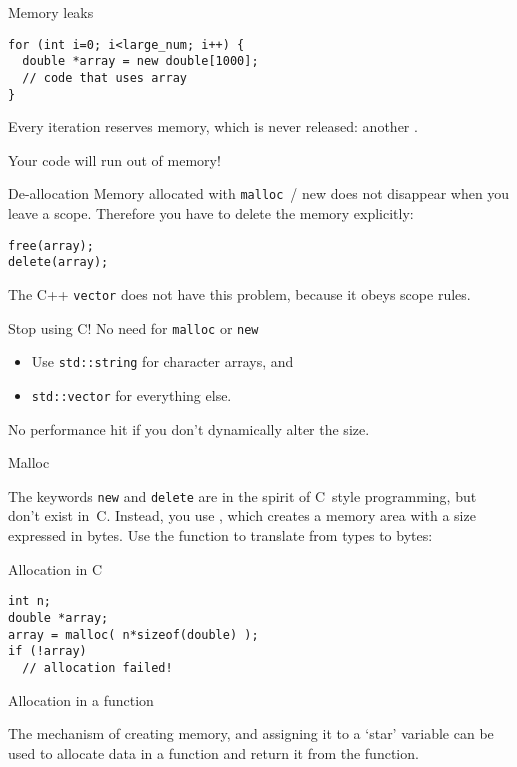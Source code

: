 \begin{block}{Memory leaks}
  \label{sl:leak2}
\begin{lstlisting}
for (int i=0; i<large_num; i++) {
  double *array = new double[1000];
  // code that uses array
}
\end{lstlisting}
  Every iteration reserves memory, which is never released:
  another .

  Your code will run out of memory!
\end{block}

\begin{block}{De-allocation}
  \label{sl:c-array-del}
  Memory allocated with \lstinline{malloc}~/ {new}
  does not disappear when you leave a
  scope. Therefore you have to delete the memory explicitly:
\begin{lstlisting}
free(array);
delete(array);
\end{lstlisting}
The C++ \lstinline{vector} does not have this problem, because it obeys scope rules.
\end{block}

\begin{block}{Stop using C!}
  \label{sl:no-c-malloc}
  No need for \lstinline{malloc} or \lstinline{new}
  \begin{itemize}
  \item Use \lstinline{std::string} for character arrays, and
  \item \lstinline{std::vector} for everything else.
  \end{itemize}
  No performance hit if you don't dynamically alter the size.
\end{block}

 {Malloc}

The keywords \lstinline{new} and \lstinline{delete} are in the spirit of C~style
programming, but don't exist in~C. Instead, you use
, which creates a memory area with a size
expressed in bytes. Use the function  to translate
from types to bytes:

\begin{block}{Allocation in C}
\begin{lstlisting}
int n;
double *array;
array = malloc( n*sizeof(double) );
if (!array)
  // allocation failed!
\end{lstlisting}
\end{block}

 {Allocation in a function}

The mechanism of creating memory, and assigning it to a `star'
variable
can be used to allocate data in a function and
return it from the function.

